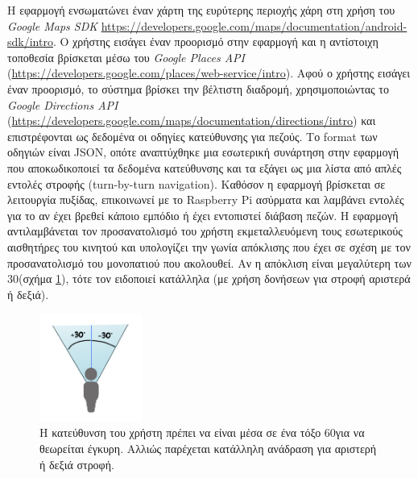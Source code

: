 Η εφαρμογή ενσωματώνει έναν χάρτη της ευρύτερης περιοχής χάρη στη χρήση του \emph{Google Maps SDK} \url{https://developers.google.com/maps/documentation/android-sdk/intro}.
Ο χρήστης εισάγει έναν προορισμό στην εφαρμογή και η αντίστοιχη τοποθεσία βρίσκεται μέσω του \emph{Google Places API} (\url{https://developers.google.com/places/web-service/intro}).
Αφού ο χρήστης εισάγει έναν προορισμό, το σύστημα βρίσκει την βέλτιστη διαδρομή, χρησιμοποιώντας το \emph{Google Directions API} (\url{https://developers.google.com/maps/documentation/directions/intro}) και επιστρέφονται ως δεδομένα οι οδηγίες κατεύθυνσης για πεζούς. Το format των οδηγιών είναι JSON, οπότε αναπτύχθηκε μια εσωτερική συνάρτηση στην εφαρμογή που αποκωδικοποιεί τα δεδομένα κατεύθυνσης και τα εξάγει ως μια λίστα από απλές εντολές στροφής (turn-by-turn navigation).
Καθόσον η εφαρμογή βρίσκεται σε λειτουργία πυξίδας, επικοινωνεί με το Raspberry Pi ασύρματα και λαμβάνει εντολές για το αν έχει βρεθεί κάποιο εμπόδιο ή έχει εντοπιστεί διάβαση πεζών. Η εφαρμογή αντιλαμβάνεται τον προσανατολισμό του χρήστη εκμεταλλευόμενη τους εσωτερικούς αισθητήρες του κινητού και υπολογίζει την γωνία απόκλισης που έχει σε σχέση με τον προσανατολισμό του μονοπατιού που ακολουθεί. Αν η απόκλιση είναι μεγαλύτερη των 30\degree (σχήμα \ref{fig:degree-orientation}), τότε τον ειδοποιεί κατάλληλα (με χρήση δονήσεων για στροφή αριστερά ή δεξιά).
\begin{figure}[H]
    \centering
    \includegraphics[width=0.3\textwidth]{images/degree_orientation.png}
    \caption{Η κατεύθυνση του χρήστη πρέπει να είναι μέσα σε ένα τόξο 60\degree για να θεωρείται έγκυρη. Αλλιώς παρέχεται κατάλληλη ανάδραση για αριστερή ή δεξιά στροφή.}
    \label{fig:degree-orientation}
\end{figure}
